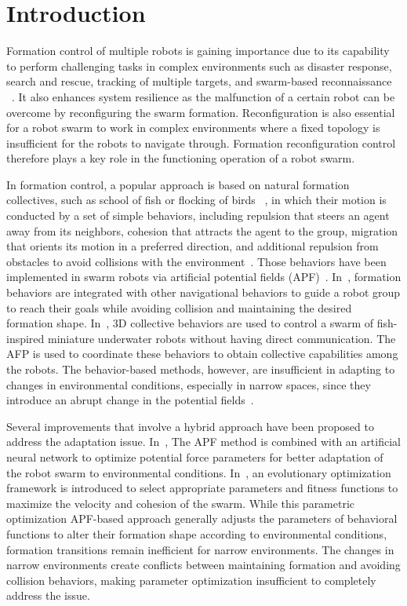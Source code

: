 \section{Introduction}
Formation control of multiple robots is gaining importance due to its capability to perform challenging tasks in complex environments such as disaster response, search and rescue, tracking of multiple targets, and swarm-based reconnaissance ~\cite{9306908,Oh2015}. It also enhances system resilience as the malfunction of a certain robot can be overcome by reconfiguring the swarm formation. Reconfiguration is also essential for a robot swarm to work in complex environments where a fixed topology is insufficient for the robots to navigate through. Formation reconfiguration control therefore plays a key role in the functioning operation of a robot swarm.

In formation control, a popular approach is based on natural formation collectives, such as school of fish or flocking of birds ~\cite {Nagy2010}, in which their motion is conducted by a set of simple behaviors, including repulsion that steers an agent away from its neighbors, cohesion that attracts the agent to the group, migration that orients its motion in a preferred direction, and additional repulsion from obstacles to avoid collisions with the environment~\cite{Reynolds1987}. Those behaviors have been implemented in swarm robots via artificial potential fields (APF)~\cite{736776,Berlinger2021,9565893}. In~\cite{736776}, formation behaviors are integrated with other navigational behaviors to guide a robot group to reach their goals while avoiding collision and maintaining the desired formation shape. In~\cite{Berlinger2021}, 3D collective behaviors are used to control a swarm of fish-inspired miniature underwater robots without having direct communication. The AFP is used to coordinate these behaviors to obtain collective capabilities among the robots. The behavior-based methods, however, are insufficient in adapting to changes in environmental conditions, especially in narrow spaces, since they introduce an abrupt change in the potential fields~\cite{Zhang2023}.

Several improvements that involve a hybrid approach have been proposed to address the adaptation issue. In~\cite{Elkilany2020}, The APF method is combined with an artificial neural network to optimize potential force parameters for better adaptation of the robot swarm to environmental conditions. In~\cite{Vsrhelyi2018}, an evolutionary optimization framework is introduced to select appropriate parameters and fitness functions to maximize the velocity and cohesion of the swarm. While this parametric optimization APF-based approach generally adjusts the parameters of behavioral functions to alter their formation shape according to environmental conditions, formation transitions remain inefficient for narrow environments. The changes in narrow environments create conflicts between maintaining formation and avoiding collision behaviors, making parameter optimization insufficient to completely address the issue.

